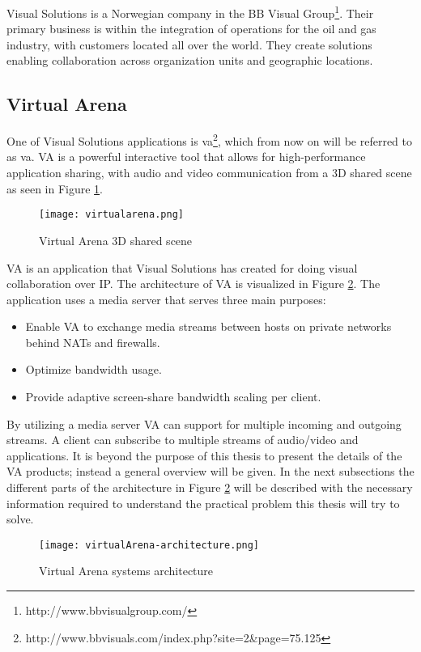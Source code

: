 Visual Solutions is a Norwegian company in the BB Visual Group\footnote{http://www.bbvisualgroup.com/}. Their primary business is within the integration of operations for the oil and gas industry, with customers located all over the world. They create solutions enabling collaboration across organization units and geographic locations.

\subsection{Virtual Arena}
One of Visual Solutions applications is \gls{va}\footnote{http://www.bbvisuals.com/index.php?site=2\&page=75.125}, which from now on will be referred to as \gls{va}. VA is a powerful interactive tool that allows for high-performance application sharing, with audio and video communication from a 3D shared scene as seen in Figure \ref{fig:vsva-3d-scene}.
\\
\begin{figure}[here]
\centerline{\texttt{[image: virtualarena.png]}}
\caption{Virtual Arena 3D shared scene}
\label{fig:vsva-3d-scene}
\end{figure}


VA is an application that Visual Solutions has created for doing visual collaboration over IP. The architecture of VA is visualized in Figure \ref{fig:vsva-architecture}. The application uses a media server that serves three main purposes:
\begin{itemize}
\item Enable VA to exchange media streams between hosts on private networks behind NATs and firewalls.
\item Optimize bandwidth usage.
\item Provide adaptive screen-share bandwidth scaling per client.
\end{itemize}

By utilizing a media server VA can support for multiple incoming and outgoing streams. A client can subscribe to multiple streams of audio/video and applications. It is beyond the purpose of this thesis to present the details of the VA products; instead a general overview will be given. In the next subsections the different parts of the architecture in Figure \ref{fig:vsva-architecture} will be described with the necessary information required to understand the practical problem this thesis will try to solve. 
\\
\begin{figure}[here]
\centerline{\texttt{[image: virtualArena-architecture.png]}}
\caption{Virtual Arena systems architecture}
\label{fig:vsva-architecture}
\end{figure}

